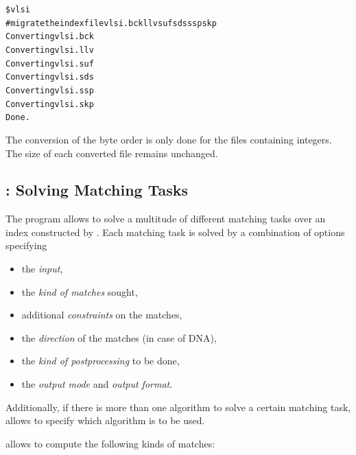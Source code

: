 \documentclass[12pt,titlepage]{article}
\makeatletter
\newcommand{\Program}[2]{\index{#2@#1}}
\newenvironment{LargeOutput}{%
 \begin{footnotesize}
 \begin{alltt}}{%
 \end{alltt}
 \end{footnotesize}%
 \addvspace{-\medskipamount}
}
\makeatother
\begin{document}
\begin{LargeOutput}
\$ \VMI vlsi
\# migrate the indexfile vlsi.{bck llv suf sds ssp skp}
Converting vlsi.bck
Converting vlsi.llv
Converting vlsi.suf
Converting vlsi.sds
Converting vlsi.ssp
Converting vlsi.skp
Done.
\end{LargeOutput}

The conversion of the byte order is only done for the files containing 
integers. The size of each converted file remains unchanged.

\begin{AboutVmatch}
\section[\VM]{\VM: Solving Matching Tasks}\label{VM}\Program{\VM}{vmatch}

The program \VM allows to solve a multitude of different matching tasks 
over an index constructed by \MKV. Each matching task is solved by
a combination of options specifying
\begin{itemize}
\item
the \emph{input},
\item
the \emph{kind of matches} sought,
\item
additional \emph{constraints} on the matches,
\item
the \emph{direction} of the matches (in case of DNA),
\item
the \emph{kind of postprocessing} to be done,
\item
the \emph{output mode} and \emph{output format}.
\end{itemize}
Additionally, if there is more than one algorithm to solve a certain
matching task, \VM allows to specify which algorithm is to be used.

\VM allows to compute the following kinds of matches:


\end{AboutVmatch}
\end{document}
